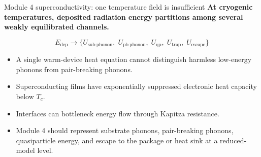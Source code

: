 \documentclass[aspectratio=169,10pt]{beamer}
\begin{document}
\begin{frame}{Module 4 superconductivity: one temperature field is insufficient}
\small
\textbf{At cryogenic temperatures, deposited radiation energy partitions among several weakly equilibrated channels.}

\vspace{0.15em}
\begin{equation*}
\boxed{
E_{\mathrm{dep}}
\rightarrow
\{U_{\mathrm{sub\ phonon}},\;U_{\mathrm{pb\ phonon}},\;U_{\mathrm{qp}},\;U_{\mathrm{trap}},\;U_{\mathrm{escape}}\}
}
\end{equation*}

\vspace{-0.1em}
\begin{itemize}
    \item A single warm-device heat equation cannot distinguish harmless low-energy phonons from pair-breaking phonons.
    \item Superconducting films have exponentially suppressed electronic heat capacity below $T_c$.
    \item Interfaces can bottleneck energy flow through Kapitza resistance.
    \item Module 4 should represent substrate phonons, pair-breaking phonons, quasiparticle energy, and escape to the package or heat sink at a reduced-model level.
\end{itemize}
\end{frame}
\end{document}

